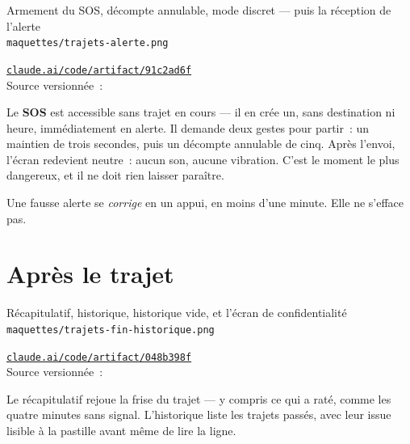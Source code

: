 \begin{center}
    {Armement du SOS, décompte annulable, mode discret --- puis la réception de l'alerte\\
     \texttt{maquettes/trajets-alerte.png}}
\end{center}

\begin{note}
\href{https://claude.ai/code/artifact/91c2ad6f-cc73-4233-9d55-4b8b905bca8d}%
{\texttt{claude.ai/code/artifact/91c2ad6f}}\\
Source versionnée~: 
\end{note}

Le \textbf{SOS} est accessible sans trajet en cours --- il en crée un, sans destination ni
heure, immédiatement en alerte. Il demande deux gestes pour partir~: un maintien de trois
secondes, puis un décompte annulable de cinq. Après l'envoi, l'écran redevient neutre~:
aucun son, aucune vibration. C'est le moment le plus dangereux, et il ne doit rien laisser
paraître.

Une fausse alerte se \emph{corrige} en un appui, en moins d'une minute. Elle ne s'efface pas.

\section{Après le trajet}

\begin{center}
    {Récapitulatif, historique, historique vide, et l'écran de confidentialité\\
     \texttt{maquettes/trajets-fin-historique.png}}
\end{center}

\begin{note}
\href{https://claude.ai/code/artifact/048b398f-985e-45dd-b4e5-0d34a7ae5a69}%
{\texttt{claude.ai/code/artifact/048b398f}}\\
Source versionnée~: 
\end{note}

Le récapitulatif rejoue la frise du trajet --- y compris ce qui a raté, comme les quatre
minutes sans signal. L'historique liste les trajets passés, avec leur issue lisible à la
pastille avant même de lire la ligne.

